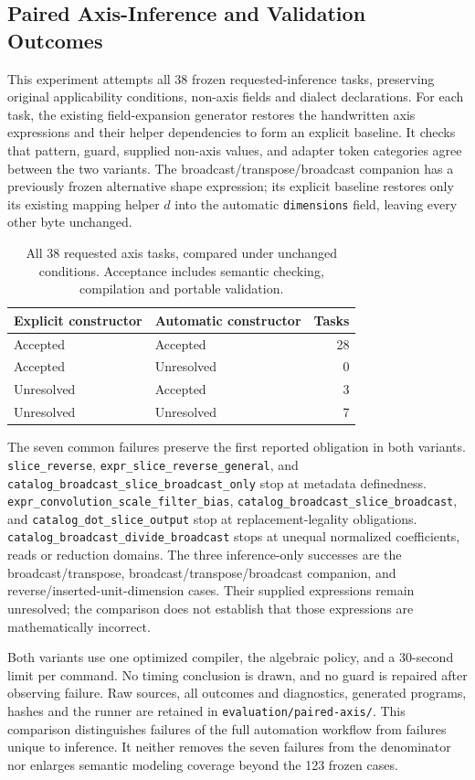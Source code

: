 \subsection{Paired Axis-Inference and Validation Outcomes}
\label{app:paired-axis}
This experiment attempts all 38 frozen requested-inference tasks, preserving
original applicability conditions, non-axis fields and dialect declarations.
For each task, the existing field-expansion generator restores the handwritten
axis expressions and their helper dependencies to form an explicit baseline.
It checks that pattern, guard, supplied non-axis values, and adapter token
categories agree between the two variants. The broadcast/transpose/broadcast
companion has a previously frozen alternative shape expression; its explicit
baseline restores only its existing mapping helper $d$ into the automatic
\nolinkurl{dimensions} field, leaving every other byte unchanged.

\begin{table}[!htbp]
\caption{All 38 requested axis tasks, compared under unchanged conditions.
Acceptance includes semantic checking, compilation and portable validation.}
\label{tab:paired-axis-outcomes}
\small
\begin{tabularx}{\linewidth}{@{}YYr@{}}\toprule
Explicit constructor & Automatic constructor & Tasks\\\midrule
Accepted & Accepted & 28\\
Accepted & Unresolved & 0\\
Unresolved & Accepted & 3\\
Unresolved & Unresolved & 7\\\bottomrule
\end{tabularx}
\end{table}
The seven common failures preserve the first reported obligation in both
variants. \nolinkurl{slice_reverse}, \nolinkurl{expr_slice_reverse_general}, and
\nolinkurl{catalog_broadcast_slice_broadcast_only} stop at metadata definedness.
\nolinkurl{expr_convolution_scale_filter_bias},
\nolinkurl{catalog_broadcast_slice_broadcast}, and
\nolinkurl{catalog_dot_slice_output} stop at replacement-legality obligations.
\nolinkurl{catalog_broadcast_divide_broadcast} stops at unequal normalized
coefficients, reads or reduction domains. The three inference-only successes
are the broadcast/transpose, broadcast/transpose/broadcast companion, and
reverse/inserted-unit-dimension cases. Their supplied expressions remain
unresolved; the comparison does not establish that those expressions are
mathematically incorrect.

Both variants use one optimized compiler, the algebraic policy, and a
30-second limit per command. No timing conclusion is drawn, and no guard
is repaired after observing failure. Raw sources, all outcomes and
diagnostics, generated programs, hashes and the runner are retained in
\nolinkurl{evaluation/paired-axis/}. This comparison distinguishes failures of
the full automation workflow from failures unique to inference. It neither
removes the seven failures from the denominator nor enlarges semantic
modeling coverage beyond the 123 frozen cases.
